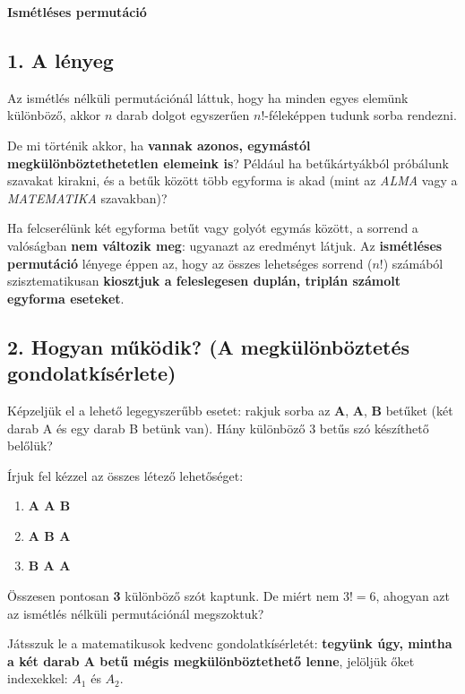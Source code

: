 \documentclass[11pt, a4paper]{article}
\begin{document}
\begin{center}
    \LARGE \textbf{Ismétléses permutáció} \\
    \vspace{0.5cm}
\end{center}

\vspace{0.3cm}

\subsection*{1. A lényeg}
Az ismétlés nélküli permutációnál láttuk, hogy ha minden egyes elemünk különböző, akkor $n$ darab dolgot egyszerűen $n!$-féleképpen tudunk sorba rendezni.

De mi történik akkor, ha \textbf{vannak azonos, egymástól megkülönböztethetetlen elemeink is}? Például ha betűkártyákból próbálunk szavakat kirakni, és a betűk között több egyforma is akad (mint az \textit{ALMA} vagy a \textit{MATEMATIKA} szavakban)?

Ha felcserélünk két egyforma betűt vagy golyót egymás között, a sorrend a valóságban \textbf{nem változik meg}: ugyanazt az eredményt látjuk. Az \textbf{ismétléses permutáció} lényege éppen az, hogy az összes lehetséges sorrend ($n!$) számából szisztematikusan \textbf{kiosztjuk a feleslegesen duplán, triplán számolt egyforma eseteket}.

\subsection*{2. Hogyan működik? (A megkülönböztetés gondolatkísérlete)}
Képzeljük el a lehető legegyszerűbb esetet: rakjuk sorba az \textbf{A}, \textbf{A}, \textbf{B} betűket (két darab A és egy darab B betünk van). Hány különböző 3 betűs szó készíthető belőlük? 

Írjuk fel kézzel az összes létező lehetőséget:
\begin{enumerate}
    \item \textbf{A A B}
    \item \textbf{A B A}
    \item \textbf{B A A}
\end{enumerate}
Összesen pontosan \textbf{3} különböző szót kaptunk. De miért nem $3! = 6$, ahogyan azt az ismétlés nélküli permutációnál megszoktuk?

Játsszuk le a matematikusok kedvenc gondolatkísérletét: \textbf{tegyünk úgy, mintha a két darab A betű mégis megkülönböztethető lenne}, jelöljük őket indexekkel: $A_1$ és $A_2$.
\end{document}

